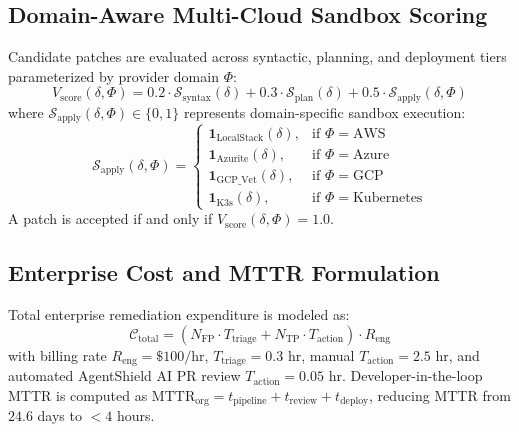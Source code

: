 \documentclass[runningheads]{llncs}
\begin{document}
\subsection{Domain-Aware Multi-Cloud Sandbox Scoring}
Candidate patches are evaluated across syntactic, planning, and deployment tiers parameterized by provider domain $\Phi$:
\begin{equation}
V_{\mathrm{score}}(\delta, \Phi) = 0.2 \cdot \mathcal{S}_{\mathrm{syntax}}(\delta) + 0.3 \cdot \mathcal{S}_{\mathrm{plan}}(\delta) + 0.5 \cdot \mathcal{S}_{\mathrm{apply}}(\delta, \Phi)
\end{equation}
where $\mathcal{S}_{\mathrm{apply}}(\delta, \Phi) \in \{0, 1\}$ represents domain-specific sandbox execution:
\begin{equation}
\mathcal{S}_{\mathrm{apply}}(\delta, \Phi) = \begin{cases} 
\mathbf{1}_{\mathrm{LocalStack}}(\delta), & \text{if } \Phi = \mathrm{AWS} \\ 
\mathbf{1}_{\mathrm{Azurite}}(\delta), & \text{if } \Phi = \mathrm{Azure} \\ 
\mathbf{1}_{\mathrm{GCP\_Vet}}(\delta), & \text{if } \Phi = \mathrm{GCP} \\ 
\mathbf{1}_{\mathrm{K3s}}(\delta), & \text{if } \Phi = \mathrm{Kubernetes} 
\end{cases}
\end{equation}
A patch is accepted if and only if $V_{\mathrm{score}}(\delta, \Phi) = 1.0$.

\subsection{Enterprise Cost and MTTR Formulation}
Total enterprise remediation expenditure is modeled as:
\begin{equation}
\mathcal{C}_{\mathrm{total}} = \left(N_{\mathrm{FP}} \cdot T_{\mathrm{triage}} + N_{\mathrm{TP}} \cdot T_{\mathrm{action}}\right) \cdot R_{\mathrm{eng}}
\end{equation}
with billing rate $R_{\mathrm{eng}} = \$100/\text{hr}$, $T_{\mathrm{triage}} = 0.3\text{ hr}$, manual $T_{\mathrm{action}} = 2.5\text{ hr}$, and automated AgentShield AI PR review $T_{\mathrm{action}} = 0.05\text{ hr}$. Developer-in-the-loop MTTR is computed as $\mathrm{MTTR}_{\mathrm{org}} = t_{\mathrm{pipeline}} + t_{\mathrm{review}} + t_{\mathrm{deploy}}$, reducing MTTR from $24.6$ days to $<4$ hours.
\end{document}
